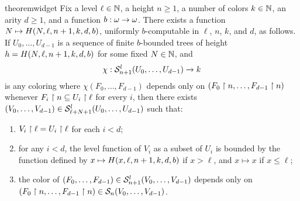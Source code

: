 
\begin{restatable}{theorem}{widget}
  \label{thm:main-widget-theorem}
	Fix a level $\ell \in \mathbb{N}$, a height $n \geq 1$, a number of colors $k \in \mathbb{N}$, an arity $d \geq 1$, and a function $b:\omega\to\omega$. There exists a function $N \mapsto H(N,\ell,n+1,k,d,b)$, uniformly $b$-computable in $\ell$, $n$, $k$, and $d$, as follows. If $U_0,\dots, U_{d-1}$ is a sequence of finite $b$-bounded trees of height $h = H(N,\ell,n+1,k,d,b)$ for some fixed $N \in \mathbb{N}$, and
  \[\chi:\mathcal{S}^{l}_{n+1}({U_0,\dots,U_{d-1}})\to k\]
  is any coloring where $\chi(F_0,\dots, F_{d-1})$ depends only on $(F_0\upharpoonright n,\dots, F_{d-1}\upharpoonright n)$ whenever $F_{i}\upharpoonright n\subseteq U_i\upharpoonright \ell$ for every $i$,  then there exists $(V_0, \dots, V_{d-1}) \in\mathcal{S}^{l}_{\ell+N+1}({U_0,\dots, U_{d-1}})$ such that:
  \begin{enumerate}
  \item\label{item:stems-widget} $V_i\upharpoonright \ell = U_i\upharpoonright \ell$ for each $i < d$;
  \item\label{item:hbound-widget} for any $i<d$, the level function of $V_i$ as a subset of $U_i$ is bounded by the function defined by $x\mapsto H(x,\ell, n+1,k,d, b)$ if $x>\ell$, and $x\mapsto x$ if $x\leq\ell$;
  \item\label{item:monochr-widget}
    the color of $(F_0,\dots, F_{d-1})\in \mathcal{S}^{l}_{n+1}({V_0,\dots,V_{d-1}})$ depends only on $(F_0\upharpoonright n,\dots, F_{d-1}\upharpoonright n)\in \mathcal{S}_{n}({V_0,\dots,V_{d-1}})$.
  \end{enumerate}
\end{restatable}
 
